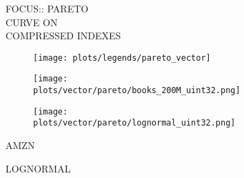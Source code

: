 \documentclass{article}
\begin{document}
\begin{figure}[!htbp]
\fbox
{
\begin{minipage}[t][0.98\textheight][t]{\textwidth}
\centering
    \begin{minipage}{0.23\linewidth}
    \footnotesize{FOCUS::  PARETO\\ CURVE ON \\ COMPRESSED INDEXES}
    \end{minipage}
   \begin{minipage}{0.75\linewidth}
        \begin{figure}[H]
        \texttt{[image: plots/legends/pareto\_vector]}
        \end{figure}
    \end{minipage}
    \vfill

   \begin{minipage}{0.48\linewidth}
        \begin{figure}[H]
        \texttt{[image: plots/vector/pareto/books\_200M\_uint32.png]}
        \end{figure}
    \end{minipage}
    \begin{minipage}{0.48\linewidth}
        \begin{figure}[H]
        \texttt{[image: plots/vector/pareto/lognormal\_uint32.png]}
        \end{figure}
    \end{minipage}
    \begin{minipage}{0.48\linewidth}
    \begin{center}
        AMZN
    \end{center}
    \end{minipage}
    \begin{minipage}{0.48\linewidth}
    \begin{center}
        LOGNORMAL
    \end{center}
    \end{minipage}

    \vfill


\end{minipage}}
\end{figure}
\end{document}
